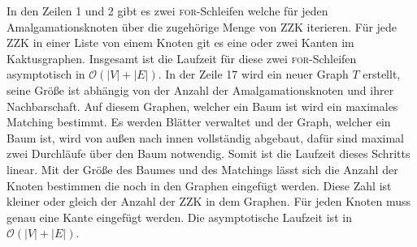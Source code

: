 In den Zeilen 1 und 2 gibt es zwei \textsc{for}-Schleifen welche für jeden Amalgamationsknoten über die zugehörige Menge von ZZK iterieren. Für jede ZZK in einer Liste von einem Knoten git es eine oder zwei Kanten im Kaktusgraphen. Insgesamt ist die Laufzeit für diese zwei \textsc{for}-Schleifen asymptotisch in $\mathcal{O}(|V|+|E|)$.\vspace{-1mm}\newline\newline
In der Zeile 17 wird ein neuer Graph $T$ erstellt, seine Größe ist abhängig von der Anzahl der Amalgamationsknoten und ihrer Nachbarschaft. Auf diesem Graphen, welcher ein Baum ist wird ein maximales Matching bestimmt. Es werden Blätter verwaltet und der Graph, welcher ein Baum ist, wird von außen nach innen vollständig abgebaut, dafür sind maximal zwei Durchläufe über den Baum notwendig. Somit ist die Laufzeit dieses Schritts linear.\vspace{-1mm}\newline\newline
Mit der Größe des Baumes und des Matchings lässt sich die Anzahl der Knoten bestimmen die noch in den Graphen eingefügt werden. Diese Zahl ist kleiner oder gleich der Anzahl der ZZK in dem Graphen. Für jeden Knoten muss genau eine Kante eingefügt werden. Die asymptotische Laufzeit ist in $\mathcal{O}(|V|+|E|)$.
